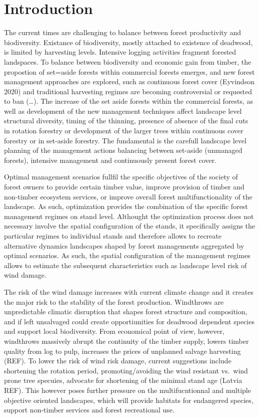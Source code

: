 \documentclass[]{elsarticle} %
\begin{document}
\newpage

\section{Introduction}\label{introduction}

The current times are challenging to balance between forest productivity
and biodiversity. Existance of biodiversity, mostly attached to
existence of deadwood, is limited by harvesting levels. Intensive
logging activities fragment forested landspaces. To balance between
biodiversity and economic gain from timber, the propostion of set=aside
forests within commercial forests emerges, and new forest management
approaches are explored, such as continuous forest cover (Eyvindson
2020) and traditional harvesting regimes are becoming controversial or
requested to ban (\ldots{}). The increase of the set aside forests
within the commercial forests, as well as development of the new
management techniques affect landscape level structural diversity,
timing of the thinning, presence of absence of the final cuts in
rotation forestry or development of the larger trees within continuous
cover forestry or in set-aside forestry. The fundamental is the carefull
landscape level planning of the management actions balancing between
set-aside (unmanaged forests), intensive management and continuously
present forest cover.

Optimal management scenarios fullfil the specific objectives of the
society of forest owners to provide certain timber value, improve
provision of timber and non-timber ecosystem services, or improve
overall forest multifunctionality of the landscape. As such,
optimization provides the combination of the specific forest management
regimes on stand level. Althought the optimization process does not
necessary involve the spatial configuration of the stands, it
specifically assigns the particular regimes to individual stands and
therefore allows to recreate alternative dynamics landscapes shaped by
forest managements aggregated by optimal scenarios. As such, the spatial
configuration of the management regimes allows to estimate the
subsequent characteristics such as landscape level risk of wind damage.

The risk of the wind damage increases with current climate change and it
creates the major risk to the stability of the forest production.
Windthrows are unpredictable climatic disruption that shapes forest
structure and composition, and if left unsalvaged could create
opportiunities for deadwood dependent species and support local
biodiversity. From economical point of view, however, windthrows
massively abrupt the continuity of the timber supply, lowers timber
quality from log to pulp, increases the prices of unplanned salvage
harvesting (REF). To lower the risk of wind risk damage, current
suggestions include shortening the rotation period, promoting/avoiding
the wind resistant vs.~wind prone tree specuies, advocate for shortening
of the minimal stand age (Latvia REF). This however poses further
pressure on the multifucntionnal and multiple objective oriented
landscapes, which will provide habitats for endangered species, support
non-timber services and forest recreational use.
\end{document}
